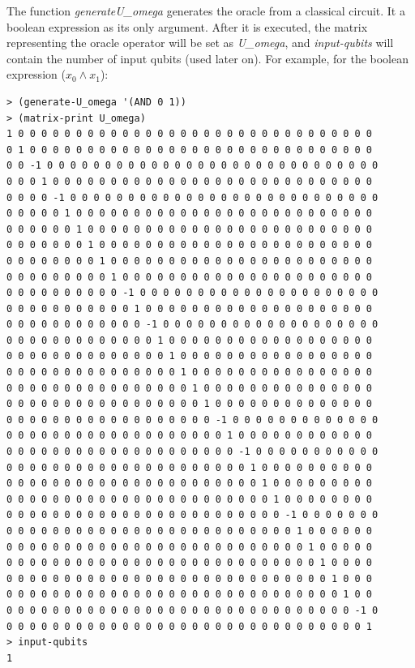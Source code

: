 \documentclass[11pt]{report}
\newcommand{\?}{\stackrel{?}{=}}
\begin{document}
The function \textit{generate\-U\_omega} generates the oracle from a classical circuit. It a boolean expression as its only argument. After it is executed, the matrix representing the oracle operator will be set as \textit{U\_omega}, and \textit{input-qubits} will contain the number of input qubits (used later on). For example, for the boolean expression ($x_0 \land x_1$):

\begin{verbatim}
> (generate-U_omega '(AND 0 1))
> (matrix-print U_omega)
1 0 0 0 0 0 0 0 0 0 0 0 0 0 0 0 0 0 0 0 0 0 0 0 0 0 0 0 0 0 0 0 
0 1 0 0 0 0 0 0 0 0 0 0 0 0 0 0 0 0 0 0 0 0 0 0 0 0 0 0 0 0 0 0 
0 0 -1 0 0 0 0 0 0 0 0 0 0 0 0 0 0 0 0 0 0 0 0 0 0 0 0 0 0 0 0 0 
0 0 0 1 0 0 0 0 0 0 0 0 0 0 0 0 0 0 0 0 0 0 0 0 0 0 0 0 0 0 0 0 
0 0 0 0 -1 0 0 0 0 0 0 0 0 0 0 0 0 0 0 0 0 0 0 0 0 0 0 0 0 0 0 0 
0 0 0 0 0 1 0 0 0 0 0 0 0 0 0 0 0 0 0 0 0 0 0 0 0 0 0 0 0 0 0 0 
0 0 0 0 0 0 1 0 0 0 0 0 0 0 0 0 0 0 0 0 0 0 0 0 0 0 0 0 0 0 0 0 
0 0 0 0 0 0 0 1 0 0 0 0 0 0 0 0 0 0 0 0 0 0 0 0 0 0 0 0 0 0 0 0 
0 0 0 0 0 0 0 0 1 0 0 0 0 0 0 0 0 0 0 0 0 0 0 0 0 0 0 0 0 0 0 0 
0 0 0 0 0 0 0 0 0 1 0 0 0 0 0 0 0 0 0 0 0 0 0 0 0 0 0 0 0 0 0 0 
0 0 0 0 0 0 0 0 0 0 -1 0 0 0 0 0 0 0 0 0 0 0 0 0 0 0 0 0 0 0 0 0 
0 0 0 0 0 0 0 0 0 0 0 1 0 0 0 0 0 0 0 0 0 0 0 0 0 0 0 0 0 0 0 0 
0 0 0 0 0 0 0 0 0 0 0 0 -1 0 0 0 0 0 0 0 0 0 0 0 0 0 0 0 0 0 0 0 
0 0 0 0 0 0 0 0 0 0 0 0 0 1 0 0 0 0 0 0 0 0 0 0 0 0 0 0 0 0 0 0 
0 0 0 0 0 0 0 0 0 0 0 0 0 0 1 0 0 0 0 0 0 0 0 0 0 0 0 0 0 0 0 0 
0 0 0 0 0 0 0 0 0 0 0 0 0 0 0 1 0 0 0 0 0 0 0 0 0 0 0 0 0 0 0 0 
0 0 0 0 0 0 0 0 0 0 0 0 0 0 0 0 1 0 0 0 0 0 0 0 0 0 0 0 0 0 0 0 
0 0 0 0 0 0 0 0 0 0 0 0 0 0 0 0 0 1 0 0 0 0 0 0 0 0 0 0 0 0 0 0 
0 0 0 0 0 0 0 0 0 0 0 0 0 0 0 0 0 0 -1 0 0 0 0 0 0 0 0 0 0 0 0 0 
0 0 0 0 0 0 0 0 0 0 0 0 0 0 0 0 0 0 0 1 0 0 0 0 0 0 0 0 0 0 0 0 
0 0 0 0 0 0 0 0 0 0 0 0 0 0 0 0 0 0 0 0 -1 0 0 0 0 0 0 0 0 0 0 0 
0 0 0 0 0 0 0 0 0 0 0 0 0 0 0 0 0 0 0 0 0 1 0 0 0 0 0 0 0 0 0 0 
0 0 0 0 0 0 0 0 0 0 0 0 0 0 0 0 0 0 0 0 0 0 1 0 0 0 0 0 0 0 0 0 
0 0 0 0 0 0 0 0 0 0 0 0 0 0 0 0 0 0 0 0 0 0 0 1 0 0 0 0 0 0 0 0 
0 0 0 0 0 0 0 0 0 0 0 0 0 0 0 0 0 0 0 0 0 0 0 0 -1 0 0 0 0 0 0 0 
0 0 0 0 0 0 0 0 0 0 0 0 0 0 0 0 0 0 0 0 0 0 0 0 0 1 0 0 0 0 0 0 
0 0 0 0 0 0 0 0 0 0 0 0 0 0 0 0 0 0 0 0 0 0 0 0 0 0 1 0 0 0 0 0 
0 0 0 0 0 0 0 0 0 0 0 0 0 0 0 0 0 0 0 0 0 0 0 0 0 0 0 1 0 0 0 0 
0 0 0 0 0 0 0 0 0 0 0 0 0 0 0 0 0 0 0 0 0 0 0 0 0 0 0 0 1 0 0 0 
0 0 0 0 0 0 0 0 0 0 0 0 0 0 0 0 0 0 0 0 0 0 0 0 0 0 0 0 0 1 0 0 
0 0 0 0 0 0 0 0 0 0 0 0 0 0 0 0 0 0 0 0 0 0 0 0 0 0 0 0 0 0 -1 0 
0 0 0 0 0 0 0 0 0 0 0 0 0 0 0 0 0 0 0 0 0 0 0 0 0 0 0 0 0 0 0 1 
> input-qubits
1
\end{verbatim}
\end{document}
